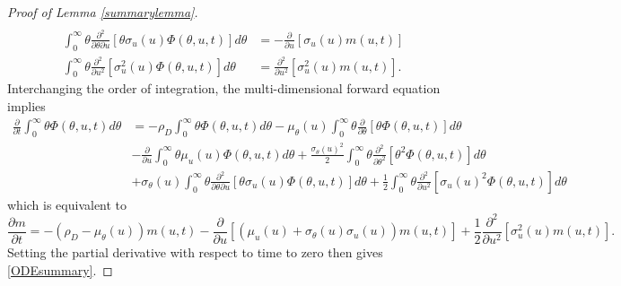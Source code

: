 \documentclass[11pt]{article}
\theoremstyle{plain}
\begin{document}
\begin{proof}[Proof of Lemma \ref{summarylemma}]
\begin{align*}
\\  \int_{0}^{\infty}\theta\frac{\partial^2}{\partial \theta \partial u}[\theta \sigma_u(u)\Phi(\theta,u,t)]d\theta & =
- \frac{\partial}{\partial u}[\sigma_u(u) m(u,t)]
\\ \int_{0}^{\infty}\theta\frac{\partial^2}{\partial u^2}[\sigma_u^2(u)\Phi(\theta,u,t)]d\theta
& = \frac{\partial^2}{\partial u^2}[\sigma_u^2(u)m(u,t)].
\end{align*}
Interchanging the order of integration, the multi-dimensional forward equation implies
\begin{align*}
\frac{\partial }{\partial t} \int_{0}^{\infty}\theta\Phi (\theta,u,t)d\theta & = - \rho_D\int_{0}^{\infty}\theta\Phi(\theta,u,t)d\theta - \mu_{\theta}(u) \int_{0}^{\infty}\theta\frac{\partial}{\partial \theta}[\theta\Phi(\theta,u,t)]d\theta
\\ & - \frac{\partial}{\partial u}\int_{0}^{\infty}\theta \mu_u(u)\Phi(\theta,u,t) d\theta + \frac{\sigma_{\theta}(u)^2}{2}\int_{0}^{\infty}\theta\frac{\partial^2}{\partial \theta^2}[\theta^2\Phi(\theta,u,t)]d\theta
\\ & + \sigma_{\theta}(u)\int_{0}^{\infty}\theta\frac{\partial^2}{\partial \theta \partial u}[\theta \sigma_u(u)\Phi(\theta,u,t)]d\theta
 + \frac{1}{2}\int_{0}^{\infty}\theta\frac{\partial^2}{\partial u^2}[\sigma_u(u)^2\Phi(\theta,u,t)]d\theta
\end{align*}
which is equivalent to 
$$
\frac{\partial m}{\partial t} = -(\rho_D - \mu_{\theta}(u))m(u,t) - \frac{\partial}{\partial u}[(\mu_u(u) + \sigma_{\theta}(u)\sigma_u(u))m(u,t)] + \frac{1}{2}\frac{\partial^2}{\partial u^2}[\sigma^2_u(u)m(u,t)].
$$
Setting the partial derivative with respect to time to zero then gives \eqref{ODEsummary}.
\end{proof}
\end{document}

